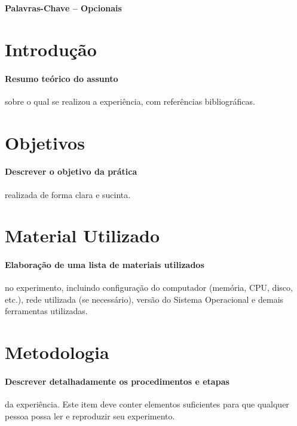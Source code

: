 \documentclass[10pt, a4paper]{article}
\title{\mytitle}
\author{\myauthor\hspace{1em}\\\contact\\Centro de Ciências Exatas e Tecnológicas -- Colegiado de Ciência da Computação\hspace{0.5em}\\\hspace{0.5em}\mymodule}
\date{}
\begin{document}
	\maketitle
	\begin{abstract}
        Duas ou três sentenças que sumarizem o experimento. Não há necessidade de se aprofundar. 
	\end{abstract}
    
	\textbf{Palavras-Chave -- Opcionais}{\mykeywords}

	\section{Introdução}
    \paragraph{Resumo teórico do assunto} sobre o qual se realizou a experiência, com referências bibliográficas.
    
	\section{Objetivos}
    \paragraph{Descrever o objetivo da prática} realizada de forma clara e sucinta.

    \section{Material Utilizado}

    \paragraph{Elaboração de uma lista de materiais utilizados} no experimento, incluindo configuração do computador (memória, CPU, disco, etc.), rede utilizada (se necessário), versão do Sistema Operacional e demais ferramentas utilizadas.
    
    \section{Metodologia}

    \paragraph{Descrever detalhadamente os procedimentos e etapas} da experiência. Este item deve conter elementos suficientes para que qualquer pessoa possa ler e reproduzir seu experimento.
\end{document}

